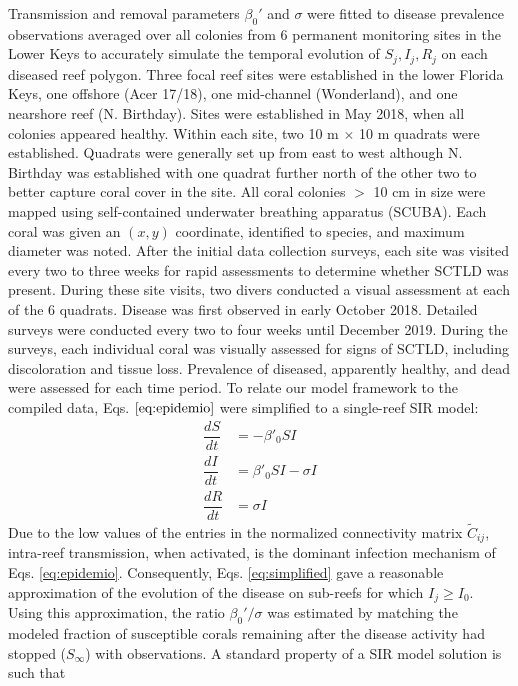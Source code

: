 Transmission and removal parameters $\beta_0'$ and $\sigma$ were fitted to disease prevalence observations averaged over all colonies from 6 permanent monitoring sites in the Lower Keys to accurately simulate the temporal evolution of $S_j,I_j,R_j$ on each diseased reef polygon. Three focal reef sites were established in the lower Florida Keys, one offshore (Acer 17/18), one mid-channel (Wonderland), and one nearshore reef (N. Birthday). Sites were established in May 2018, when all colonies appeared healthy. Within each site, two 10 m $\times$ 10 m quadrats were established. Quadrats were generally set up from east to west although N. Birthday was established with one quadrat further north of the other two to better capture coral cover in the site. All coral colonies $>$ 10 cm in size were mapped using self-contained underwater breathing apparatus (SCUBA). Each coral was given an $(x,y)$ coordinate, identified to species, and maximum diameter was noted. After the initial data collection surveys, each site was visited every two to three weeks for rapid assessments to determine whether SCTLD was present. During these site visits, two divers conducted a visual assessment at each of the 6 quadrats. Disease was first observed in early October 2018. Detailed surveys were conducted every two to four weeks until December 2019. During the surveys, each individual coral was visually assessed for signs of SCTLD, including discoloration and tissue loss. Prevalence of diseased, apparently healthy, and dead were assessed for each time period. To relate our model framework to the compiled data, Eqs. $\ref{eq:epidemio}$ were simplified to a single-reef SIR model:
\begin{equation}
    \begin{aligned}
        \dfrac{dS}{dt} &= -\beta'_0SI \\
        \dfrac{dI}{dt} &= \beta'_0SI - \sigma I \\
        \dfrac{dR}{dt} &= \sigma I
    \end{aligned}\label{eq:simplified}
\end{equation}
Due to the low values of the entries in the normalized connectivity matrix $\tilde{C}_{ij}$, intra-reef transmission, when activated, is the dominant infection mechanism of Eqs. \ref{eq:epidemio}. Consequently, Eqs. \ref{eq:simplified} gave a reasonable approximation of the evolution of the disease on sub-reefs for which $I_j \geq I_0$. Using this approximation, the ratio $\beta_0'/\sigma$ was estimated by matching the modeled fraction of susceptible corals remaining after the disease activity had stopped ($S_\infty$) with observations. A standard property of a SIR model solution is such that
